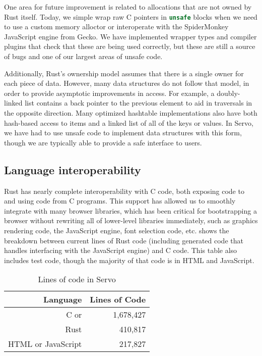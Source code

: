 One area for future improvement is related to allocations that are not owned by Rust itself.
Today, we simple wrap raw C pointers in \lstinline[language=Rust]{unsafe} blocks when we need to use a
custom memory alloctor or interoperate with the SpiderMonkey JavaScript engine from Gecko.
We have implemented wrapper types and compiler plugins that check that these are being used correctly,
but these are still a source of bugs and one of our largest areas of unsafe code.

Additionally, Rust's ownership model assumes that there is a single owner for each piece of data.
However, many data structures do not follow that model, in order to provide asymptotic
improvements in access.
For example, a doubly-linked list contains a back pointer to the previous element to aid
in traversals in the opposite direction.
Many optimized hashtable implementations also have both hash-based access to items
and a linked list of all of the keys or values.
In Servo, we have had to use unsafe code to implement data structures with this form,
though we are typically able to provide a safe interface to users.

\subsection{Language interoperability}
Rust has nearly complete interoperability with C code, both exposing code to and using code from
C programs.
This support has allowed us to smoothly integrate with many browser libraries, which has been
critical for bootstrapping a browser without rewriting all of lower-level libraries immediately, such as
graphics rendering code, the JavaScript engine, font selection code, etc.
 shows the breakdown between current lines of Rust code (including generated code that
handles interfacing with the JavaScript engine) and C code.
This table also includes test code, though the majority of that code is in HTML and JavaScript.
\begin{table}
  \begin{center}
    \begin{tabular}{r || r}
      Language & Lines of Code \\
      \hline
      C or \Cplusplus{} & 1,678,427 \\
      Rust & 410,817 \\
      HTML or JavaScript & 217,827 \\
    \end{tabular}%
  \end{center}%
  \caption{Lines of code in Servo}
  \label{servo-loc}
\end{table}

